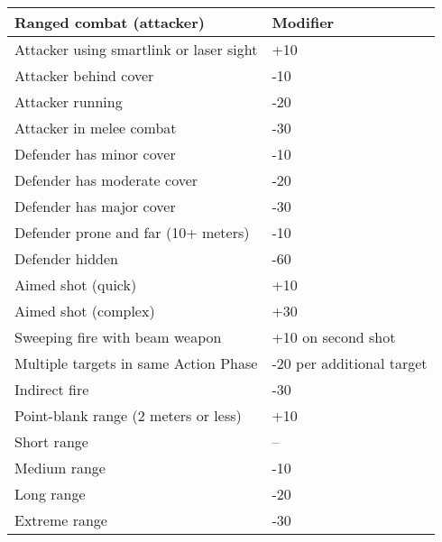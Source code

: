\begin{table}
\begin{tabularx}{\textwidth}{|X|l|}
\textbf{Ranged combat (attacker)} &\textbf{Modifier}	\\ \hline

Attacker using smartlink or laser sight	&+10	\\ \hline

Attacker behind cover &-10	\\ \hline

Attacker running &-20	\\ \hline

Attacker in melee combat &-30	\\ \hline

Defender has minor cover &-10	\\ \hline

Defender has moderate cover &-20	\\ \hline

Defender has major cover &-30	\\ \hline

Defender prone and far (10+ meters) &-10	\\ \hline

Defender hidden &-60	\\ \hline

Aimed shot (quick) &+10	\\ \hline

Aimed shot (complex) &+30	\\ \hline

Sweeping fire with beam weapon &+10 on second shot	\\ \hline

Multiple targets in same Action Phase &-20 per additional target \\ \hline

Indirect fire &-30	\\ \hline

Point-blank range (2 meters or less) &+10	\\ \hline

Short range &--	\\ \hline

Medium range &-10	\\ \hline

Long range &-20	\\ \hline

Extreme range &-30	\\ \hline

\end{tabularx} \label{tab:combat-modifiers} \end{table} 



